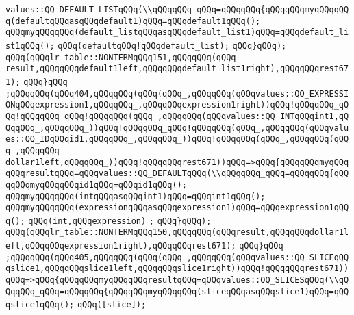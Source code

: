 \verb|values::QQ_DEFAULT_LISTqQQq(\\qQQqqQQq_qQQq=qQQqqQQq{qQQqqQQqmyqQQqqQQq(defaultqQQqasqQQqdefault1)qQQq=qQQqdefault1qQQq();|\newline
\verb|qQQqmyqQQqqQQq(default_listqQQqasqQQqdefault_list1)qQQq=qQQqdefault_list1qQQq();|\newline
\verb|qQQq(defaultqQQq!qQQqdefault_list);|\newline
\verb|qQQq}qQQq);|\newline
\verb|qQQq(qQQqlr_table::NONTERMqQQq151,qQQqqQQq(qQQq|\newline
\verb|result,qQQqqQQqdefault1left,qQQqqQQqdefault_list1right),qQQqqQQqrest671);|\newline
\verb|qQQq}qQQq|\newline
\verb|;qQQqqQQq(qQQq404,qQQqqQQq(qQQq(qQQq_,qQQqqQQq(qQQqvalues::QQ_EXPRESSIONqQQqexpression1,qQQqqQQq_,qQQqqQQqexpression1right))qQQq!qQQqqQQq_qQQq!qQQqqQQq_qQQq!qQQqqQQq(qQQq_,qQQqqQQq(qQQqvalues::QQ_INTqQQqint1,qQQqqQQq_,qQQqqQQq_))qQQq!qQQqqQQq_qQQq!qQQqqQQq(qQQq_,qQQqqQQq(qQQqvalues::QQ_IDqQQqid1,qQQqqQQq_,qQQqqQQq_))qQQq!qQQqqQQq(qQQq_,qQQqqQQq(qQQq_,qQQqqQQq|\newline
\verb|dollar1left,qQQqqQQq_))qQQq!qQQqqQQqrest671))qQQq=>qQQq{qQQqqQQqmyqQQqqQQqresultqQQq=qQQqvalues::QQ_DEFAULTqQQq(\\qQQqqQQq_qQQq=qQQqqQQq{qQQqqQQqmyqQQqqQQqid1qQQq=qQQqid1qQQq();|\newline
\verb|qQQqmyqQQqqQQq(intqQQqasqQQqint1)qQQq=qQQqint1qQQq();|\newline
\verb|qQQqmyqQQqqQQq(expressionqQQqasqQQqexpression1)qQQq=qQQqexpression1qQQq();|\newline
\verb|qQQq(int,qQQqexpression)|\newline
\verb|;|\newline
\verb|qQQq}qQQq);|\newline
\verb|qQQq(qQQqlr_table::NONTERMqQQq150,qQQqqQQq(qQQqresult,qQQqqQQqdollar1left,qQQqqQQqexpression1right),qQQqqQQqrest671);|\newline
\verb|qQQq}qQQq|\newline
\verb|;qQQqqQQq(qQQq405,qQQqqQQq(qQQq(qQQq_,qQQqqQQq(qQQqvalues::QQ_SLICEqQQqslice1,qQQqqQQqslice1left,qQQqqQQqslice1right))qQQq!qQQqqQQqrest671))qQQq=>qQQq{qQQqqQQqmyqQQqqQQqresultqQQq=qQQqvalues::QQ_SLICESqQQq(\\qQQqqQQq_qQQq=qQQqqQQq{qQQqqQQqmyqQQqqQQq(sliceqQQqasqQQqslice1)qQQq=qQQqslice1qQQq();|\newline
\verb|qQQq([slice]);|\newline
